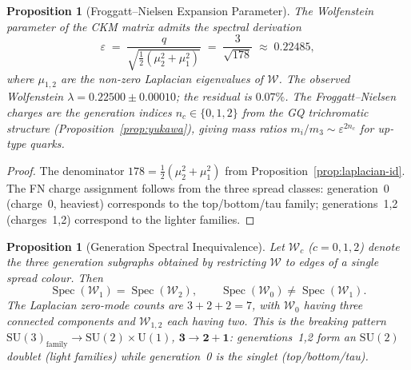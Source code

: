 \documentclass[12pt,a4paper]{article}
\newtheorem{proposition}[theorem]{Proposition}
\begin{document}

\begin{proposition}[Froggatt--Nielsen Expansion Parameter]\label{prop:fn}
The Wolfenstein parameter of the CKM matrix admits the spectral
derivation
\[
  \varepsilon
  \;=\;
  \frac{q}{\sqrt{\tfrac{1}{2}(\mu_2^2 + \mu_1^2)}}
  \;=\;
  \frac{3}{\sqrt{178}}
  \;\approx\; 0.22485,
\]
where $\mu_{1,2}$ are the non-zero Laplacian eigenvalues of
$\mathcal{W}$.
The observed Wolfenstein $\lambda = 0.22500 \pm 0.00010$;
the residual is $0.07\%$.
The Froggatt--Nielsen charges are the generation
indices $n_c \in \{0,1,2\}$ from the GQ trichromatic
structure (Proposition~\ref{prop:yukawa}),
giving mass ratios $m_i/m_3 \sim \varepsilon^{2n_c}$ for
up-type quarks.
\end{proposition}

\begin{proof}
The denominator $178 = \frac{1}{2}(\mu_2^2 + \mu_1^2)$
from Proposition~\ref{prop:laplacian-id}.
The FN charge assignment follows from the three spread classes:
generation~0 (charge~0, heaviest) corresponds to the top/bottom/tau
family; generations~1,2 (charges~1,2) correspond to the lighter families.
\end{proof}


\begin{proposition}[Generation Spectral Inequivalence]\label{prop:gen-break}
Let $\mathcal{W}_c$ ($c = 0,1,2$) denote the three generation
subgraphs obtained by restricting $\mathcal{W}$ to edges of a
single spread colour.  Then
\[
  \operatorname{Spec}(\mathcal{W}_1) = \operatorname{Spec}(\mathcal{W}_2),
  \qquad
  \operatorname{Spec}(\mathcal{W}_0) \neq \operatorname{Spec}(\mathcal{W}_1).
\]
The Laplacian zero-mode counts are $3 + 2 + 2 = 7$, with
$\mathcal{W}_0$ having three connected components and
$\mathcal{W}_{1,2}$ each having two.
This is the breaking pattern
$\mathrm{SU}(3)_{\mathrm{family}} \to \mathrm{SU}(2) \times \mathrm{U}(1)$,
$\mathbf{3} \to \mathbf{2} + \mathbf{1}$:
generations~1,2 form an $\mathrm{SU}(2)$ doublet (light families)
while generation~0 is the singlet (top/bottom/tau).
\end{proposition}
\end{document}
